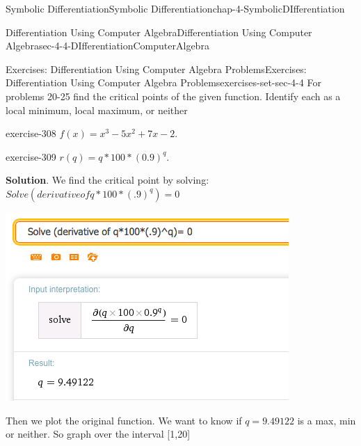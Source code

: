 \documentclass[oneside,10pt,]{book}
\numberwithin{equation}{section}
\begin{document}
\begin{chapterptx}{Symbolic Differentiation}{}{Symbolic Differentiation}{}{}{chap-4-SymbolicDIfferentiation}
\begin{sectionptx}{Differentiation Using Computer Algebra}{}{Differentiation Using Computer Algebra}{}{}{sec-4-4-DIfferentiationComputerAlgebra}
\begin{exercises-subsection-numberless}{Exercises: Differentiation Using Computer Algebra Problems}{}{Exercises: Differentiation Using Computer Algebra Problems}{}{}{exercises-set-sec-4-4}
\hypertarget{p-1770}{}%
For problems 20-25 find the critical points of the given function.  Identify each as a local minimum, local maximum, or neither%
\begin{divisionexercise}{20}{}{}{exercise-308}%
\hypertarget{p-1771}{}%
\(f(x)=x^3-5x^2+7x-2\).%
\end{divisionexercise}%
\begin{divisionexercise}{21}{}{}{exercise-309}%
\hypertarget{p-1772}{}%
\(r(q)=q*100*(0.9)^q\).%
\par\smallskip%
\noindent\textbf{Solution}.\hypertarget{solution-154}{}\quad%
\hypertarget{p-1773}{}%
We find the critical point by solving: \(Solve (derivative of q*100*(.9)^q)= 0\)%
\begin{sidebyside}{1}{0.3}{0.3}{0}%
\begin{sbspanel}{0.4}%
\includegraphics[width=1\linewidth]{images/sec4-4-sol21a.png}
\end{sbspanel}%
\end{sidebyside}%
\par
\hypertarget{p-1774}{}%
Then we plot the original function. We want to know if \(q = 9.49122\) is a max, min or neither. So graph over the interval [1,20]%
\begin{sidebyside}{1}{0.25}{0.25}{0}%
\begin{sbspanel}{0.5}%

\end{sbspanel}
\end{sidebyside}
\end{divisionexercise}
\end{exercises-subsection-numberless}
\end{sectionptx}
\end{chapterptx}
\end{document}
